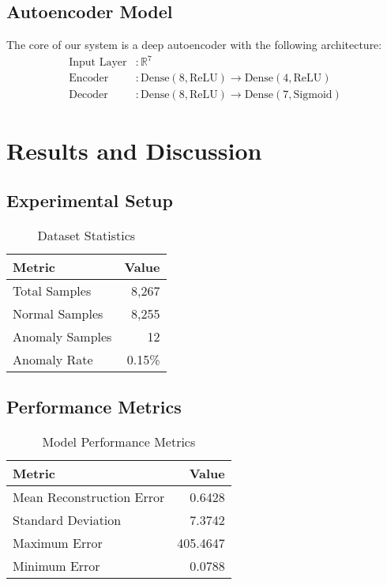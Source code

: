 \documentclass[12pt, a4paper]{article}
\begin{document}
\subsection{Autoencoder Model}
The core of our system is a deep autoencoder with the following architecture:
\begin{equation}
\begin{split}
\text{Input Layer} & : \mathbb{R}^7 \\
\text{Encoder} & : \text{Dense}(8, \text{ReLU}) \rightarrow \text{Dense}(4, \text{ReLU}) \\
\text{Decoder} & : \text{Dense}(8, \text{ReLU}) \rightarrow \text{Dense}(7, \text{Sigmoid})
\end{split}
\end{equation}

\section{Results and Discussion}
\subsection{Experimental Setup}
\begin{table}[H]
\centering
\caption{Dataset Statistics}
\label{tab:dataset}
\begin{tabular}{|l|r|}
\hline
\textbf{Metric} & \textbf{Value} \\
\hline
Total Samples & 8,267 \\
Normal Samples & 8,255 \\
Anomaly Samples & 12 \\
Anomaly Rate & 0.15\% \\
\hline
\end{tabular}
\end{table}

\subsection{Performance Metrics}
\begin{table}[H]
\centering
\caption{Model Performance Metrics}
\label{tab:performance}
\begin{tabular}{|l|r|}
\hline
\textbf{Metric} & \textbf{Value} \\
\hline
Mean Reconstruction Error & 0.6428 \\
Standard Deviation & 7.3742 \\
Maximum Error & 405.4647 \\
Minimum Error & 0.0788 \\
\hline
\end{tabular}
\end{table}
\end{document}
